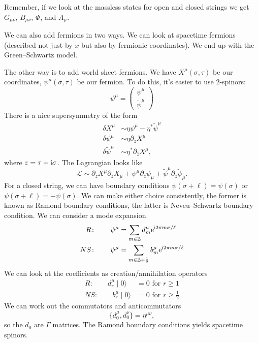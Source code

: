 \lecture

Remember, if we look at the massless states for open and closed strings
we get $G_{\mu\nu}$, $B_{\mu\nu}$, $\Phi$, and $A_{\mu}$.

We can also add fermions in two ways. We can look at spacetime fermions
(described not just by $x$ but also by fermionic coordinates). We end up
with the Green--Schwartz model.

The other way is to add world sheet fermions. We have
$X^{\mu}(\sigma,\tau)$ be our coordinates, $\psi^{\mu}(\sigma,\tau)$ be
our fermion.
To do this, it's easier to use $2$-spinors:
\begin{equation}
  \psi^{\mu} = \begin{pmatrix}
    \psi^{\mu}\\ \widetilde{\psi}^{\mu}
\end{pmatrix}
\end{equation}
There is a nice supersymmetry of the form
\begin{subequations}
\begin{align}
\delta X^{\mu} &\sim\eta\psi^{\mu}-\eta^{*}\widetilde{\psi}^{\mu}\\
\delta\psi^{\mu}&\sim\eta\partial_{z}X^{\mu}\\
\delta\widetilde{\psi}^{\mu}&\sim\eta^{*}\partial_{\bar{z}}X^{\mu},
\end{align}
\end{subequations}
where $z=\tau+\mathrm{i}\sigma$.
The Lagrangian looks like
\begin{equation}
  \mathcal{L}\sim\partial_{z}X^{\mu}\partial_{\bar{z}}X_{\mu}
  + \psi^{\mu}\partial_{\bar{z}}\psi_{\mu}
  + \widetilde{\psi}^{\mu}\partial_{z}\widetilde{\psi}_{\mu}.
\end{equation}
For a closed string, we can have boundary conditions
$\psi(\sigma+\ell)=\psi(\sigma)$ or $\psi(\sigma+\ell)=-\psi(\sigma)$.
We can make either choice consistently, the former is known as Ramond
boundary conditions, the latter is Neveu--Schwartz boundary condition.
We can consider a mode expansion
\begin{equation}
  \begin{split}
  R\colon\qquad\psi^{\mu} &= \sum_{m\in\mathbb{Z}} d^{\mu}_{m}\mathrm{e}^{\mathrm{i} 2\pi m\sigma/\ell}\\
NS\colon\qquad\psi^{\mu} &= \sum_{m\in\mathbb{Z}+\frac{1}{2}}b^{\mu}_{m}\mathrm{e}^{\mathrm{i}2\pi m\sigma/\ell}
  \end{split}
\end{equation}
We can look at the coefficients as creation/annihilation
operators
\begin{equation}
  \begin{split}
  R\colon\qquad d^{\mu}_{r}\mid0\rangle &= 0\mbox{ for }r\geq1\\
NS\colon\qquad b^{\mu}_{r}\mid 0\rangle &= 0\mbox{ for } r\geq\frac{1}{2}
  \end{split}
\end{equation}
We can work out the commutators and anticommutators
\begin{equation}
\{d^{\mu}_{0},d^{\nu}_{0}\}=\eta^{\mu\nu},
\end{equation}
so the $d_{0}$ are $\Gamma$ matrices. The Ramond boundary conditions
yields spacetime spinors.

